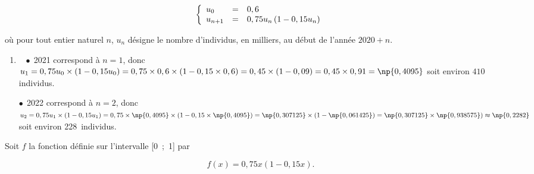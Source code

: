 
\medskip

%



\[\left\{\begin{array}{l c l}
u_0		&=	&0,6\\
u_{n+1}	&=	&0,75 u_n\left(1 - 0,15 u_n\right)
\end{array}\right.\]

où pour tout entier naturel $n$, $u_n$ désigne le nombre d'individus, en milliers, au début de l'année $2020 + n$.

\medskip

\begin{enumerate}
\item ~
$\bullet~~$2021 correspond à $n = 1$, donc $u_1 = 0,75u_0 \times \left(1 - 0,15u_0\right) = 0,75 \times 0,6\times (1 - 0,15 \times 0,6) = 0,45 \times (1 - 0,09) = 0,45 \times0,91 = \np{0,4095}$ soit environ $410$ individus.

$\bullet~~$2022 correspond à $n = 2$, donc $u_2 = 0,75u_1 \times \left(1 - 0,15u_1\right) = 0,75 \times \np{0,4095}\times (1 - 0,15 \times \np{0,4095}) = \np{0,307125} \times (1 - \np{0,061425}) = \np{0,307125} \times \np{0,938575}) \approx \np{0,2282}$ soit environ 228~individus.
\end{enumerate}

Soit $f$ la fonction définie sur l'intervalle [0~;~1] par 

\[f(x) = 0,75x (1 - 0,15x).\]

